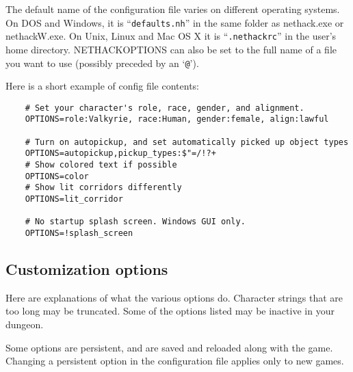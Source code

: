 The default name of the configuration file varies on different
operating systems. On DOS and Windows, it is ``{\tt defaults.nh}''
in the same folder as nethack.exe or nethackW.exe. On Unix, Linux
and Mac OS X it is ``{\tt.nethackrc}'' in the user's home directory.
NETHACKOPTIONS can also be set to the full name of a file you
want to use (possibly preceded by an `{\tt @}').

Here is a short example of config file contents:
\begin{verbatim}
    # Set your character's role, race, gender, and alignment.
    OPTIONS=role:Valkyrie, race:Human, gender:female, align:lawful

    # Turn on autopickup, and set automatically picked up object types
    OPTIONS=autopickup,pickup_types:$"=/!?+
    # Show colored text if possible
    OPTIONS=color
    # Show lit corridors differently
    OPTIONS=lit_corridor

    # No startup splash screen. Windows GUI only.
    OPTIONS=!splash_screen
\end{verbatim}

\subsection*{Customization options}

Here are explanations of what the various options do.
Character strings that are too long may be truncated.
Some of the options listed may be inactive in your dungeon.

Some options are persistent, and are saved and reloaded along with
the game.  Changing a persistent option in the configuration file
applies only to new games.

